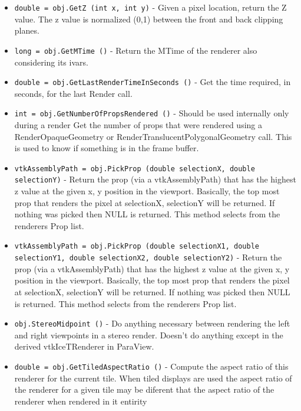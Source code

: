 \begin{itemize}
\item  \verb|double = obj.GetZ (int x, int y)| -  Given a pixel location, return the Z value. The z value is
 normalized (0,1) between the front and back clipping planes.

\item  \verb|long = obj.GetMTime ()| -  Return the MTime of the renderer also considering its ivars.

\item  \verb|double = obj.GetLastRenderTimeInSeconds ()| -  Get the time required, in seconds, for the last Render call.

\item  \verb|int = obj.GetNumberOfPropsRendered ()| -  Should be used internally only during a render
 Get the number of props that were rendered using a
 RenderOpaqueGeometry or RenderTranslucentPolygonalGeometry call.
 This is used to know if something is in the frame buffer.

\item  \verb|vtkAssemblyPath = obj.PickProp (double selectionX, double selectionY)| -  Return the prop (via a vtkAssemblyPath) that has the highest z value
 at the given x, y position in the viewport.  Basically, the top most
 prop that renders the pixel at selectionX, selectionY will be returned.
 If nothing was picked then NULL is returned.  This method selects from
 the renderers Prop list.

\item  \verb|vtkAssemblyPath = obj.PickProp (double selectionX1, double selectionY1, double selectionX2, double selectionY2)| -  Return the prop (via a vtkAssemblyPath) that has the highest z value
 at the given x, y position in the viewport.  Basically, the top most
 prop that renders the pixel at selectionX, selectionY will be returned.
 If nothing was picked then NULL is returned.  This method selects from
 the renderers Prop list.

\item  \verb|obj.StereoMidpoint ()| -  Do anything necessary between rendering the left and right viewpoints
 in a stereo render. Doesn't do anything except in the derived
 vtkIceTRenderer in ParaView.

\item  \verb|double = obj.GetTiledAspectRatio ()| -  Compute the aspect ratio of this renderer for the current tile. When
 tiled displays are used the aspect ratio of the renderer for a given
 tile may be diferent that the aspect ratio of the renderer when rendered
 in it entirity


\end{itemize}
